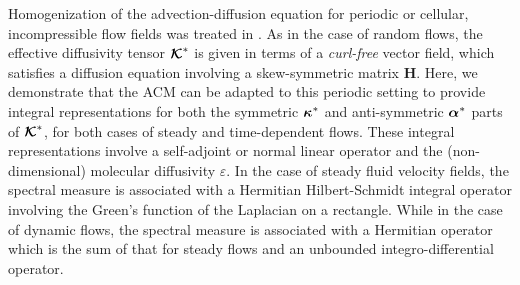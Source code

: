 \documentclass[11pt]{amsart}
\newcommand{\Hb}{\mathbf{H}}
\newcommand\Kbc{\mbox{\boldmath${\mathcal{K}}$}}
\newcommand\balpha{\mbox{\boldmath${\alpha}$}}
\newcommand\bkappa{\mbox{\boldmath${\kappa}$}}
\begin{document}
Homogenization of the advection-diffusion equation for periodic or
cellular, incompressible flow fields was treated in
\cite{Fannjiang:SIAM_JAM:333,Fannjiang:1997:1033}. As in the case of
random flows, the effective diffusivity tensor
$\Kbc^*$ is given in terms of a \emph{curl-free} vector field, which
satisfies a diffusion equation involving a skew-symmetric
matrix $\Hb$. Here, we demonstrate that the ACM can
be adapted to this periodic setting to provide integral
representations for both the symmetric $\bkappa^*$ and 
anti-symmetric $\balpha^*$ parts of $\Kbc^*$, for both cases of
steady and time-dependent flows. These integral representations
involve a self-adjoint or normal linear operator and the
(non-dimensional) molecular diffusivity $\varepsilon$. In the case of steady
fluid velocity fields, the spectral measure is associated with a
Hermitian Hilbert-Schmidt integral operator involving the Green's
function of the Laplacian on a rectangle. While in the case of dynamic 
flows, the spectral measure is associated with a Hermitian operator
which is the sum of that for steady flows and an unbounded
integro-differential operator.      
 
\end{document}
